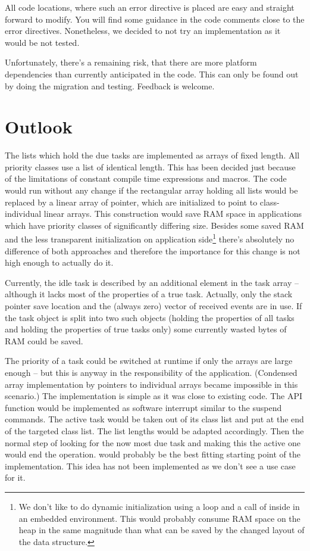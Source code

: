 All code locations, where such an error directive is placed are easy and
straight forward to modify. You will find some guidance in the code
comments close to the error directives. Nonetheless, we decided to not try
an implementation as it would be not tested.

Unfortunately, there's a remaining risk, that there are more platform
dependencies than currently anticipated in the code. This can only be
found out by doing the migration and testing. Feedback is welcome.


\chapter{Outlook}
\label{secOutlook}

The lists which hold the due tasks are implemented as arrays of fixed
length. All priority classes use a list of identical length. This has been
decided just because of the limitations of constant compile time
expressions and macros. The code would run without any change if the
rectangular array holding all lists would be replaced by a linear array of
pointer, which are initialized to point to class-individual linear arrays.
This construction would save RAM space in applications which have priority
classes of significantly differing size. Besides some saved RAM and the
less transparent initialization on application side\footnote{We don't like
to do dynamic initialization using a loop and a call of 
inside in an embedded environment. This would probably consume RAM space
on the heap in the same magnitude than what can be saved by the changed
layout of the data structure.} there's absolutely no difference of
both approaches and therefore the importance for this change is not high
enough to actually do it.

Currently, the idle task is described by an additional element in the task
array -- although it lacks most of the properties of a true task.
Actually, only the stack pointer save location and the (always zero)
vector of received events are in use. If the task object is split into two
such objects (holding the properties of all tasks and holding the
properties of true tasks only) some currently wasted bytes of RAM could be
saved.

The priority of a task could be switched at runtime if only the arrays are
large enough -- but this is anyway in the responsibility of the
application. (Condensed array implementation by pointers to individual
arrays became impossible in this scenario.) The implementation is simple
as it was close to existing code. The API function would be implemented as
software interrupt similar to the suspend commands. The active task would
be taken out of its class list and put at the end of the targeted class
list. The list lengths would be adapted accordingly. Then the normal step
of looking for the now most due task and making this the active one would
end the operation.  would probably be the best fitting
starting point of the implementation. This idea has not been implemented
as we don't see a use case for it.

